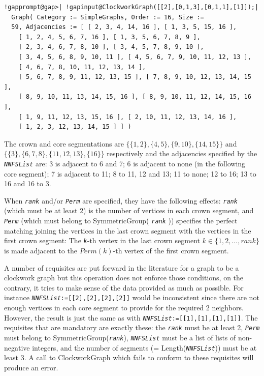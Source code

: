 \documentclass[a4paper,11pt]{report}
\begin{document}
{{{ 
\begin{Verbatim}[commandchars=!@|,fontsize=\small,frame=single,label=Example]
  !gapprompt@gap>| !gapinput@ClockworkGraph([[2],[0,1,3],[0,1,1],[1]]);|
  Graph( Category := SimpleGraphs, Order := 16, Size := 
  59, Adjacencies := [ [ 2, 3, 4, 14, 16 ], [ 1, 3, 5, 15, 16 ], 
    [ 1, 2, 4, 5, 6, 7, 16 ], [ 1, 3, 5, 6, 7, 8, 9 ], 
    [ 2, 3, 4, 6, 7, 8, 10 ], [ 3, 4, 5, 7, 8, 9, 10 ], 
    [ 3, 4, 5, 6, 8, 9, 10, 11 ], [ 4, 5, 6, 7, 9, 10, 11, 12, 13 ], 
    [ 4, 6, 7, 8, 10, 11, 12, 13, 14 ], 
    [ 5, 6, 7, 8, 9, 11, 12, 13, 15 ], [ 7, 8, 9, 10, 12, 13, 14, 15 ], 
    [ 8, 9, 10, 11, 13, 14, 15, 16 ], [ 8, 9, 10, 11, 12, 14, 15, 16 ], 
    [ 1, 9, 11, 12, 13, 15, 16 ], [ 2, 10, 11, 12, 13, 14, 16 ], 
    [ 1, 2, 3, 12, 13, 14, 15 ] ] )
\end{Verbatim}
 

The crown and core segmentations are $\{\{1,2\},\{4,5\},\{9,10\},\{14,15\}\}$ and $\{\{3\},\{6,7,8\},\{11,12,13\},\{16\}\}$ respectively and the adjacencies specified by the \mbox{\texttt{\mdseries\slshape NNFSList}} are: 3 is adjacent to 6 and 7; 6 is adjacent to none (in the following core
segment); 7 is adjacent to 11; 8 to 11, 12 and 13; 11 to none; 12 to 16; 13 to
16 and 16 to 3. 

When \mbox{\texttt{\mdseries\slshape rank}} and/or \mbox{\texttt{\mdseries\slshape Perm}} are specified, they have the following effects: \mbox{\texttt{\mdseries\slshape rank}} (which must be at least 2) is the number of vertices in each crown segment,
and \mbox{\texttt{\mdseries\slshape Perm}} (which must belong to SymmetricGroup( \mbox{\texttt{\mdseries\slshape rank}} )) specifies the perfect matching joining the vertices in the last crown
segment with the vertices in the first crown segment: The \mbox{\texttt{\mdseries\slshape k}}-th vertex in the last crown segment $k\in \{1,2,\ldots,rank\}$ is made adjacent to the $Perm(k)$-th vertex of the first crown segment. 

A number of requisites are put forward in the literature for a graph to be a
clockwork graph but this operation does not enforce those conditions, on the
contrary, it tries to make sense of the data provided as much as possible. For
instance \texttt{\mbox{\texttt{\mdseries\slshape NNFSList}}:=[[2],[2],[2],[2]]} would be inconsistent since there are not enough vertices in each core segment
to provide for the required 2 neighbors. However, the result is just the same
as with \texttt{\mbox{\texttt{\mdseries\slshape NNFSList}}:=[[1],[1],[1],[1]]}. The requisites that are mandatory are exactly these: the \mbox{\texttt{\mdseries\slshape rank}} must be at least 2, \mbox{\texttt{\mdseries\slshape Perm}} must belong to SymmetricGroup(\mbox{\texttt{\mdseries\slshape rank}}), \mbox{\texttt{\mdseries\slshape NNFSList}} must be a list of lists of non-negative integers, and the number of segments
(= Length(\mbox{\texttt{\mdseries\slshape NNFSList}})) must be at least 3. A call to ClockworkGraph which fails to conform to
these requisites will produce an error. 

}}}
\end{document}
